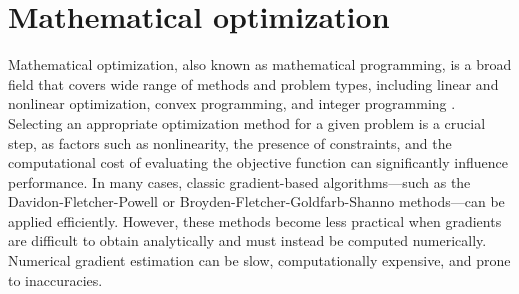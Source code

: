 \chapter{Mathematical optimization}\label{optimization}

%
%

%
%
%

Mathematical optimization, also known as mathematical programming,  is a broad field that covers wide range of methods and problem types, including linear and nonlinear optimization, convex programming, and integer programming \cite{Kochenderfer2019}. Selecting an appropriate optimization method for a given problem is a crucial step, as factors such as nonlinearity, the presence of constraints, and the computational cost of evaluating the objective function can significantly influence performance. In many cases, classic gradient-based algorithms—such as the Davidon-Fletcher-Powell \cite{Fletcher1963} or Broyden-Fletcher-Goldfarb-Shanno \cite{broyden1970} methods—can be applied efficiently. However, these methods become less practical when gradients are difficult to obtain analytically and must instead be computed numerically. Numerical gradient estimation can be slow, computationally expensive, and prone to inaccuracies.

